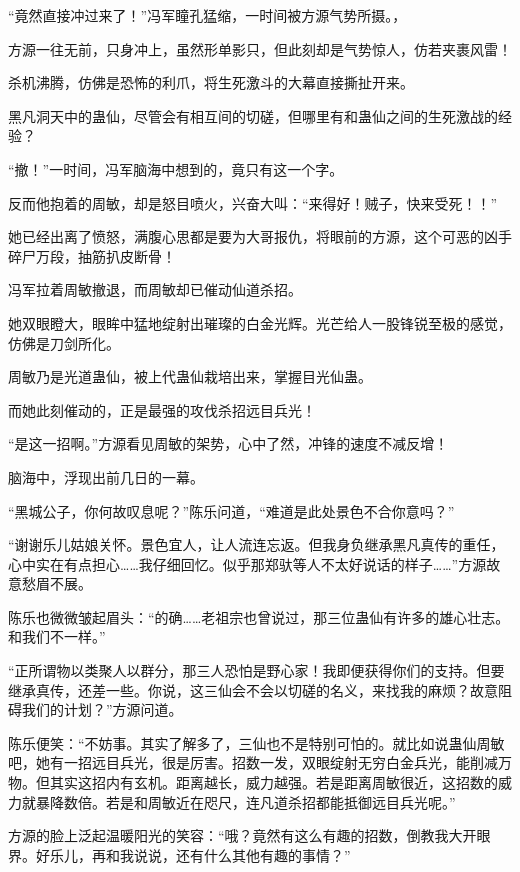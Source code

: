 
\begin{this_body}



“竟然直接冲过来了！”冯军瞳孔猛缩，一时间被方源气势所摄。，

方源一往无前，只身冲上，虽然形单影只，但此刻却是气势惊人，仿若夹裹风雷！

杀机沸腾，仿佛是恐怖的利爪，将生死激斗的大幕直接撕扯开来。

黑凡洞天中的蛊仙，尽管会有相互间的切磋，但哪里有和蛊仙之间的生死激战的经验？

“撤！”一时间，冯军脑海中想到的，竟只有这一个字。

反而他抱着的周敏，却是怒目喷火，兴奋大叫：“来得好！贼子，快来受死！！”

她已经出离了愤怒，满腹心思都是要为大哥报仇，将眼前的方源，这个可恶的凶手碎尸万段，抽筋扒皮断骨！

冯军拉着周敏撤退，而周敏却已催动仙道杀招。

她双眼瞪大，眼眸中猛地绽射出璀璨的白金光辉。光芒给人一股锋锐至极的感觉，仿佛是刀剑所化。

周敏乃是光道蛊仙，被上代蛊仙栽培出来，掌握目光仙蛊。

而她此刻催动的，正是最强的攻伐杀招远目兵光！

“是这一招啊。”方源看见周敏的架势，心中了然，冲锋的速度不减反增！

脑海中，浮现出前几日的一幕。

“黑城公子，你何故叹息呢？”陈乐问道，“难道是此处景色不合你意吗？”

“谢谢乐儿姑娘关怀。景色宜人，让人流连忘返。但我身负继承黑凡真传的重任，心中实在有点担心……我仔细回忆。似乎那郑驮等人不太好说话的样子……”方源故意愁眉不展。

陈乐也微微皱起眉头：“的确……老祖宗也曾说过，那三位蛊仙有许多的雄心壮志。和我们不一样。”

“正所谓物以类聚人以群分，那三人恐怕是野心家！我即便获得你们的支持。但要继承真传，还差一些。你说，这三仙会不会以切磋的名义，来找我的麻烦？故意阻碍我们的计划？”方源问道。

陈乐便笑：“不妨事。其实了解多了，三仙也不是特别可怕的。就比如说蛊仙周敏吧，她有一招远目兵光，很是厉害。招数一发，双眼绽射无穷白金兵光，能削减万物。但其实这招内有玄机。距离越长，威力越强。若是距离周敏很近，这招数的威力就暴降数倍。若是和周敏近在咫尺，连凡道杀招都能抵御远目兵光呢。”

方源的脸上泛起温暖阳光的笑容：“哦？竟然有这么有趣的招数，倒教我大开眼界。好乐儿，再和我说说，还有什么其他有趣的事情？”


\end{this_body}

